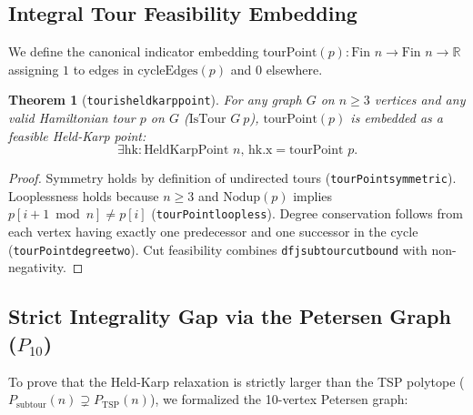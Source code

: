 \documentclass[11pt,a4paper]{article}
\renewcommand{\_}{\origunderscore\allowbreak}
\theoremstyle{plain}
\newtheorem{theorem}{Theorem}[section]
\theoremstyle{definition}
\theoremstyle{remark}
\begin{document}
\subsection{Integral Tour Feasibility Embedding}
We define the canonical indicator embedding $\text{tourPoint}(p) : \text{Fin } n \to \text{Fin } n \to \mathbb{R}$ assigning $1$ to edges in $\text{cycleEdges}(p)$ and $0$ elsewhere.

\begin{theorem}[\texttt{tour\_is\_held\_karp\_point}]
For any graph $G$ on $n \ge 3$ vertices and any valid Hamiltonian tour $p$ on $G$ ($\text{IsTour } G\ p$), $\text{tourPoint}(p)$ is embedded as a feasible Held-Karp point:
\begin{equation*}
  \exists \text{hk} : \text{HeldKarpPoint } n,\, \text{hk.x} = \text{tourPoint } p.
\end{equation*}
\end{theorem}
\begin{proof}
Symmetry holds by definition of undirected tours (\texttt{tourPoint\_symmetric}). Looplessness holds because $n \ge 3$ and $\text{Nodup}(p)$ implies $p[i+1 \bmod n] \ne p[i]$ (\texttt{tourPoint\_loopless}). Degree conservation follows from each vertex having exactly one predecessor and one successor in the cycle (\texttt{tourPoint\_degree\_two}). Cut feasibility combines \texttt{dfj\_subtour\_cut\_bound} with non-negativity.
\end{proof}

\subsection{Strict Integrality Gap via the Petersen Graph (\texorpdfstring{$P_{10}$}{P10})}
To prove that the Held-Karp relaxation is strictly larger than the TSP polytope ($P_{\text{subtour}}(n) \supsetneq P_{\text{TSP}}(n)$), we formalized the 10-vertex Petersen graph:
\end{document}
